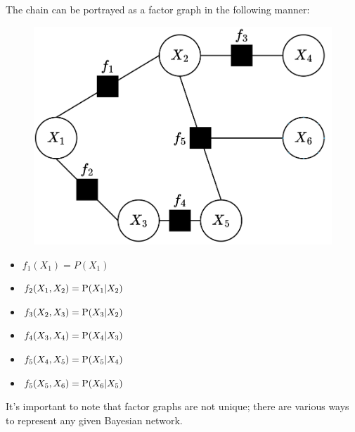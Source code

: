 \begin{example}
    The chain can be portrayed as a factor graph in the following manner:
    \begin{figure}[H]
        \centering
        \includegraphics[width=0.3\linewidth]{images/bnf.png}
    \end{figure}
    \begin{itemize}
        \item $f_1(X_1)=P(X_1)$
        \item $f_2(X_1,X_2)=\textnormal{P}(X_1|X_2)$
        \item $f_3(X_2,X_3)=\textnormal{P}(X_3|X_2)$
        \item $f_4(X_3,X_4)=\textnormal{P}(X_4|X_3)$
        \item $f_5(X_4,X_5)=\textnormal{P}(X_5|X_4)$
        \item $f_5(X_5,X_6)=\textnormal{P}(X_6|X_5)$
    \end{itemize}
\end{example}
It's important to note that factor graphs are not unique; there are various ways to represent any given Bayesian network.

